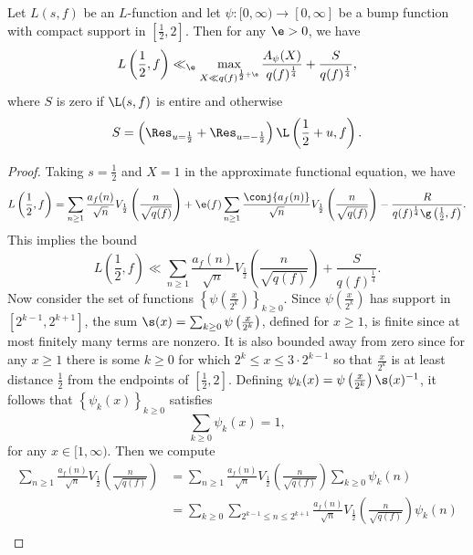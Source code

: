     \begin{theorem}
      Let $L(s,f)$ be an $L$-function and let $\psi:[0,\infty) \to [0,\infty]$ be a bump function with compact support in $\left[\frac{1}{2},2\right]$. Then for any $\e > 0$, we have
      \[
        L\left(\frac{1}{2},f\right) \ll_{\e} \max_{X \ll q(f)^{\frac{1}{2}+\e}}\frac{A_{\psi}(X)}{q(f)^{\frac{1}{4}}}+\frac{S}{q(f)^{\frac{1}{4}}},
      \]
      where $S$ is zero if $\L(s,f)$ is entire and otherwise
      \[
        S = \left(\Res_{u = \frac{1}{2}}+\Res_{u = -\frac{1}{2}}\right)\L\left(\frac{1}{2}+u,f\right).
      \]
    \end{theorem}
    \begin{proof}
      Taking $s = \frac{1}{2}$ and $X = 1$ in the approximate functional equation, we have
      \[
        L\left(\frac{1}{2},f\right) = \sum_{n \ge 1}\frac{a_{f}(n)}{\sqrt{n}}V_{\frac{1}{2}}\left(\frac{n}{\sqrt{q(f)}}\right)+\e(f)\sum_{n \ge 1}\frac{\conj{a_{f}(n)}}{\sqrt{n}}V_{\frac{1}{2}}\left(\frac{n}{\sqrt{q(f)}}\right)-\frac{R}{q(f)^{\frac{1}{4}}\g\left(\frac{1}{2},f\right)}.
      \]
      This implies the bound
      \[
        L\left(\frac{1}{2},f\right) \ll \sum_{n \ge 1}\frac{a_{f}(n)}{\sqrt{n}}V_{\frac{1}{2}}\left(\frac{n}{\sqrt{q(f)}}\right)+\frac{S}{q(f)^{\frac{1}{4}}}.
      \]
      Now consider the set of functions $\left\{\psi\left(\frac{x}{2^{k}}\right)\right\}_{k \ge 0}$. Since $\psi\left(\frac{x}{2^{k}}\right)$ has support in $[2^{k-1},2^{k+1}]$, the sum $\s(x) = \sum_{k \ge 0}\psi\left(\frac{x}{2^{k}}\right)$, defined for $x \ge 1$, is finite since at most finitely many terms are nonzero. It is also bounded away from zero since for any $x \ge 1$ there is some $k \ge 0$ for which $2^{k} \le x \le 3 \cdot 2^{k-1}$ so that $\frac{x}{2^{k}}$ is at least distance $\frac{1}{2}$ from the endpoints of $\left[\frac{1}{2},2\right]$. Defining $\psi_{k}(x) = \psi\left(\frac{x}{2^{k}}\right)\s(x)^{-1}$, it follows that $\left\{\psi_{k}(x)\right\}_{k \ge 0}$ satisfies
      \[
        \sum_{k \ge 0}\psi_{k}(x) = 1,
      \]
      for any $x \in [1,\infty)$. Then we compute
      \begin{align*}
        \sum_{n \ge 1}\frac{a_{f}(n)}{\sqrt{n}}V_{\frac{1}{2}}\left(\frac{n}{\sqrt{q(f)}}\right) &=  \sum_{n \ge 1}\frac{a_{f}(n)}{\sqrt{n}}V_{\frac{1}{2}}\left(\frac{n}{\sqrt{q(f)}}\right)\sum_{k \ge 0}\psi_{k}(n) \\
        &= \sum_{k \ge 0}\sum_{2^{k-1} \le n \le 2^{k+1}}\frac{a_{f}(n)}{\sqrt{n}}V_{\frac{1}{2}}\left(\frac{n}{\sqrt{q(f)}}\right)\psi_{k}(n) \\

\end{align*}
\end{proof}
